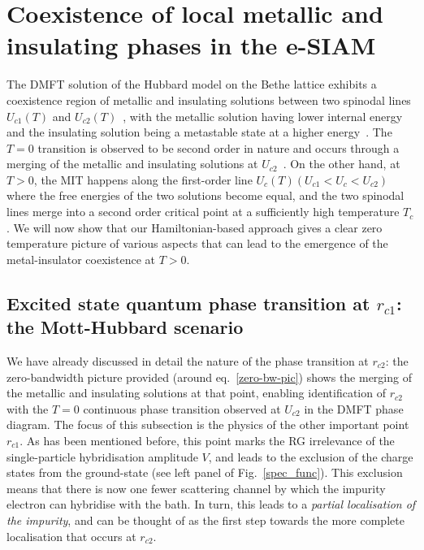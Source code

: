 \documentclass{iopart}
\begin{document}
\section{Coexistence of local metallic and insulating phases in the e-SIAM}
\label{dmft}

The DMFT solution of the Hubbard model on the Bethe lattice exhibits a coexistence region of metallic and insulating solutions between two spinodal lines \(U_{c1}(T)\) and \(U_{c2}(T)\)~\cite{georges1996}, with the metallic solution having lower internal energy and the insulating solution being a metastable state at a higher energy~\cite{moeller_1995,georges1996,bulla_1999,georges_2004_dmft,georges_krauth_1993}.
The \(T=0\) transition is observed to be second order in nature and occurs through a merging of the metallic and insulating solutions at \(U_{c2}\)~\cite{rozenberg_1994_zerotemp,moeller_1995}. On the other hand, at $T>0$, the MIT happens along the first-order line \(U_c(T) \left(U_{c1} < U_c <U_{c2} \right)\) where the free energies of the two solutions become equal, and the two spinodal lines merge into a second order critical point at a sufficiently high temperature \(T_c\).  
We will now show that our Hamiltonian-based approach gives a clear zero temperature picture of various aspects that can lead to the emergence of the metal-insulator coexistence at $T>0$.

\subsection{Excited state quantum phase transition at \(r_{c1}\): the Mott-Hubbard scenario}

We have already discussed in detail the nature of the phase transition at \(r_{c2}\): the zero-bandwidth picture provided (around eq.~\eqref{zero-bw-pic}) shows the merging of the metallic and insulating solutions at that point, enabling identification of \(r_{c2}\) with the $T=0$ continuous phase transition observed at \(U_{c2}\) in the DMFT phase diagram. The focus of this subsection is the physics of the other important point \(r_{c1}\). As has been mentioned before, this point marks the RG irrelevance of the single-particle hybridisation amplitude \(V\), and leads to the exclusion of the charge states from the ground-state (see left panel of Fig.~\eqref{spec_func}). This exclusion means that there is now one fewer scattering channel by which the impurity electron can hybridise with the bath. In turn, this leads to a {\it partial localisation of the impurity}, and can be thought of as the first step towards the more complete localisation that occurs at \(r_{c2}\).
\end{document}
